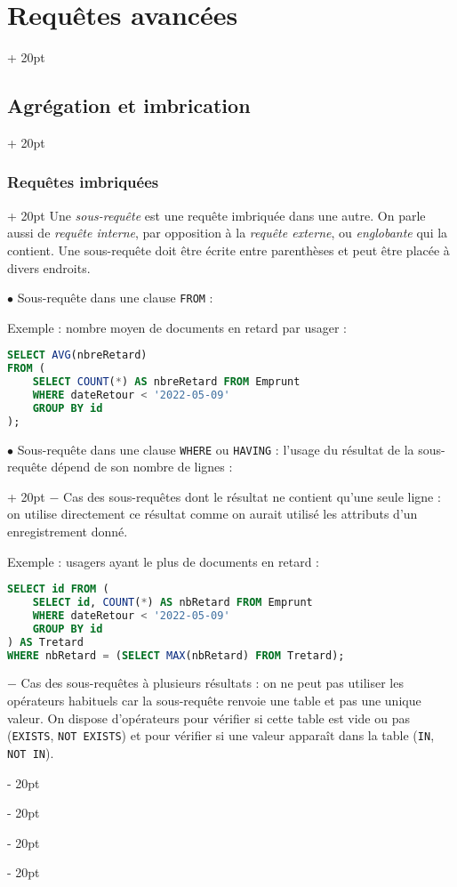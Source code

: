 \documentclass[a4paper, 12pt, twoside]{article}
\newcommand{\ind}[1][20pt]{\advance\leftskip + #1}
\newcommand{\deind}[1][20pt]{\advance\leftskip - #1}
\newenvironment{indt}[2][20pt]{#2 \par \ind[#1]}{\par \deind} %
\begin{document}
\begin{indt}{\section{Requêtes avancées}}
\begin{indt}{\subsection{Agrégation et imbrication}}
            \begin{indt}{\subsubsection{Requêtes imbriquées}}
                Une \textit{sous-requête} est une requête imbriquée dans une autre. On parle aussi de \textit{requête interne}, par opposition à la \textit{requête externe}, ou \textit{englobante} qui la contient. Une sous-requête doit être écrite entre parenthèses et peut être placée à divers endroits.

                \vspace{12pt}
                
                $\bullet$ Sous-requête dans une clause \texttt{FROM} :

                Exemple : nombre moyen de documents en retard par usager :

                \begin{lstlisting}[language=SQL, xleftmargin=80pt]
SELECT AVG(nbreRetard)
FROM (
    SELECT COUNT(*) AS nbreRetard FROM Emprunt
    WHERE dateRetour < '2022-05-09'
    GROUP BY id
);\end{lstlisting}

                \vspace{12pt}
                
                \begin{indt}{$\bullet$ Sous-requête dans une clause \texttt{WHERE} ou \texttt{HAVING} : l'usage du résultat de la sous-requête dépend de son nombre de lignes :}
                    $-$ Cas des sous-requêtes dont le résultat ne contient qu'une seule ligne : on utilise directement ce résultat comme on aurait utilisé les attributs d'un enregistrement donné.

                    Exemple : usagers ayant le plus de documents en retard :

                    \begin{lstlisting}[language=SQL, xleftmargin=100pt]
SELECT id FROM (
    SELECT id, COUNT(*) AS nbRetard FROM Emprunt
    WHERE dateRetour < '2022-05-09'
    GROUP BY id
) AS Tretard
WHERE nbRetard = (SELECT MAX(nbRetard) FROM Tretard);\end{lstlisting}

                    \vspace{12pt}
                    
                    $-$ Cas des sous-requêtes à plusieurs résultats : on ne peut pas utiliser les opérateurs habituels car la sous-requête renvoie une table et pas une unique valeur.
                    On dispose d'opérateurs pour vérifier si cette table est vide ou pas (\texttt{EXISTS}, \texttt{NOT EXISTS}) et pour vérifier si une valeur apparaît dans la table (\texttt{IN}, \texttt{NOT IN}).


\end{indt}
\end{indt}
\end{indt}
\end{indt}
\end{document}
